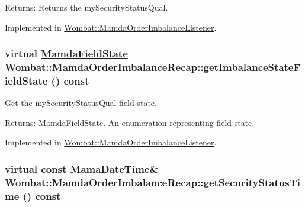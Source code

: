 \begin{Desc}
\item[Returns:]Returns the my\-Security\-Status\-Qual. \end{Desc}


Implemented in \hyperlink{classWombat_1_1MamdaOrderImbalanceListener_0c165617508c80658877e499eb3c2e41}{Wombat::Mamda\-Order\-Imbalance\-Listener}.\hypertarget{classWombat_1_1MamdaOrderImbalanceRecap_a9ffa2d99183cc651c0981c0c310eef9}{
\subsubsection[getImbalanceStateFieldState]{\setlength{\rightskip}{0pt plus 5cm}virtual \hyperlink{namespaceWombat_93aac974f2ab713554fd12a1fa3b7d2a}{Mamda\-Field\-State} Wombat::Mamda\-Order\-Imbalance\-Recap::get\-Imbalance\-State\-Field\-State () const}}
\label{classWombat_1_1MamdaOrderImbalanceRecap_a9ffa2d99183cc651c0981c0c310eef9}


Get the my\-Security\-Status\-Qual field state. 

\begin{Desc}
\item[Returns:]Mamda\-Field\-State. An enumeration representing field state. \end{Desc}


Implemented in \hyperlink{classWombat_1_1MamdaOrderImbalanceListener_63cc4f92d2bbd8f122922d5f4fb2932b}{Wombat::Mamda\-Order\-Imbalance\-Listener}.\hypertarget{classWombat_1_1MamdaOrderImbalanceRecap_f8a6454c6f2df2cec6d1bf0947cb4863}{
\subsubsection[getSecurityStatusTime]{\setlength{\rightskip}{0pt plus 5cm}virtual const Mama\-Date\-Time\& Wombat::Mamda\-Order\-Imbalance\-Recap::get\-Security\-Status\-Time () const}}
\label{classWombat_1_1MamdaOrderImbalanceRecap_f8a6454c6f2df2cec6d1bf0947cb4863}



